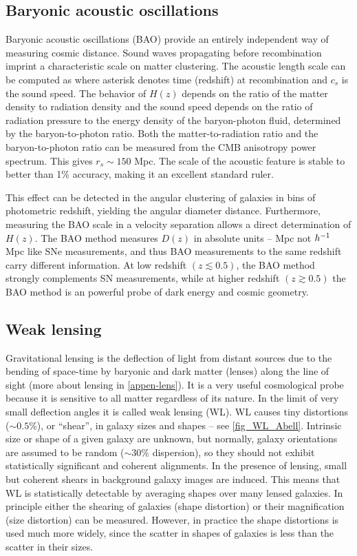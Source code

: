 \subsection{Baryonic acoustic oscillations}
Baryonic acoustic oscillations (BAO) provide an entirely independent way of measuring cosmic distance. Sound waves propagating before recombination imprint a characteristic scale on matter clustering. The acoustic length scale can be computed as
where asterisk denotes time (redshift) at recombination and $c_s$ is the sound speed. The behavior of $H(z)$ depends on the ratio of the matter density to radiation density and the sound speed depends on the ratio of radiation pressure to the energy density of the baryon-photon fluid, determined by the baryon-to-photon ratio. Both the matter-to-radiation ratio and the baryon-to-photon ratio can be measured from the CMB anisotropy power spectrum. This gives $r_s\sim150$ Mpc. The scale of the acoustic feature is stable to better than 1\% accuracy, making it an excellent standard ruler.

This effect can be detected in the angular clustering of galaxies in bins of photometric redshift, yielding the angular diameter distance. Furthermore, measuring the BAO scale in a velocity separation allows a direct determination of $H(z)$. The BAO method measures $D(z)$ in absolute units -- Mpc not $h^{-1}$ Mpc like SNe measurements, and thus BAO measurements to the same redshift carry different information. At low redshift $(z\lesssim0.5)$, the BAO method strongly complements SN measurements, while at higher redshift $(z\gtrsim0.5)$ the BAO method is an powerful probe of dark energy and cosmic geometry.
\subsection{Weak lensing}
Gravitational lensing is the deflection of light from distant sources due to the bending of space-time by baryonic and dark matter (lenses) along the line of sight (more about lensing in \autoref{appen-lens}). It is a very useful cosmological probe because it is sensitive to all matter regardless of its nature. In the limit of very small deflection angles it is called weak lensing (WL). WL causes tiny distortions ($\sim0.5\%$), or ``shear'', in galaxy sizes and shapes -- see \autoref{fig_WL_Abell}. Intrinsic size or shape of a given galaxy are unknown, but normally, galaxy orientations are assumed to be random ($\sim30\%$ dispersion), so they should not exhibit statistically significant and coherent alignments. In the presence of lensing, small but coherent shears in background galaxy images are induced. This means that WL is statistically detectable by averaging shapes over many lensed galaxies. In principle either the shearing of galaxies (shape distortion) or their magnification (size distortion) can be measured. However, in practice the shape distortions is used much more widely, since the scatter in shapes of galaxies is less than the scatter in their sizes.

